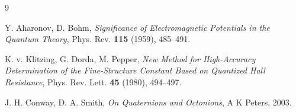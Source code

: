 \documentclass[11pt,a4paper]{article}
\begin{document}
	\begin{thebibliography}{9}
		
		Y. Aharonov, D. Bohm,
		\textit{Significance of Electromagnetic Potentials in the Quantum Theory},
		Phys. Rev. \textbf{115} (1959), 485--491.
		
		K. v. Klitzing, G. Dorda, M. Pepper,
		\textit{New Method for High-Accuracy Determination of the Fine-Structure Constant Based on Quantized Hall Resistance},
		Phys. Rev. Lett. \textbf{45} (1980), 494--497.
		
		J. H. Conway, D. A. Smith,
		\textit{On Quaternions and Octonions},
		A K Peters, 2003.
		
	\end{thebibliography}
	
\end{document}
